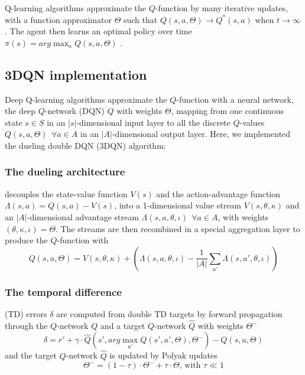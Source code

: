 \documentclass[journal]{IEEEtran}
\begin{document}
Q-learning algorithms approximate the $Q$-function by many iterative updates, with a function approximator $\Theta$ such that $Q(s,a,\Theta) \rightarrow Q^*(s,a)$ when $t \rightarrow \infty$. The agent then learns an optimal policy over time $\pi(s) = arg \max_a Q(s,a,\Theta)$ \cite{sutton2018reinforcement}.

\subsection{3DQN implementation}

Deep Q-learning algorithms approximate the $Q$-function with a neural network, the deep $Q$-network (DQN) \cite{hessel2017rainbow,mnih2013playing,mnih2015human} $Q$ with weights $\Theta$, mapping from one continuous state $s \in S$ in an $|s|$-dimensional input layer to all the discrete $Q$-values $Q(s,a,\Theta) \:\: \forall a \in A$ in an $|A|$-dimensional output layer. Here, we implemented the dueling double DQN (3DQN) algorithm: \\

\subsubsection{The dueling architecture} \cite{wang2016dueling} decouples the state-value function $V(s)$ and the action-advantage function $\Lambda(s,a) = Q(s,a) - V(s)$, into a 1-dimensional value stream $V(s,\theta,\kappa)$ and an $|A|$-dimensional advantage stream $\Lambda(s,a,\theta,\iota) \:\: \forall a \in A$, with weights $(\theta,\kappa,\iota) = \Theta$. The streams are then recombined in a special aggregation layer to produce the $Q$-function with
\[ Q(s,a,\Theta) = V(s,\theta,\kappa) + (\Lambda(s,a,\theta,\iota) - \frac{1}{|A|}\sum_{a'} \Lambda(s,a',\theta,\iota) ) \]

\subsubsection{The temporal difference} (TD) errors $\delta$ are computed from double TD targets \cite{hasselt2015deep} by forward propagation through the $Q$-network $Q$ and a target $Q$-network $\widehat{Q}$ with weights $\Theta^-$
\[ \delta = r' + \gamma \cdot \widehat{Q}(s', arg \max_{a'} Q(s',a',\Theta), \Theta^-) - Q(s,a,\Theta)\]
and the target $Q$-network $\widehat{Q}$ is updated by Polyak updates \cite{lillicrap2019continuous}
\[ \Theta^- = (1 - \tau) \cdot \Theta^- + \tau \cdot \Theta \text{, with } \tau \ll 1\]
\end{document}
